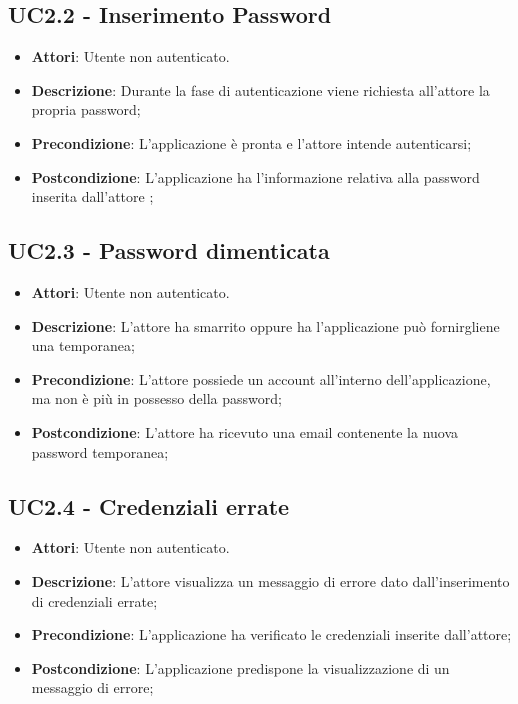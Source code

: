 \subsection{UC2.2 - Inserimento Password} 
\label{ssec:UC2.2} 
\begin{itemize} 
\item \textbf{Attori}: Utente non autenticato.
\item \textbf{Descrizione}: Durante la fase di autenticazione viene richiesta all'attore la propria password;
\item \textbf{Precondizione}: L'applicazione è pronta e l'attore intende autenticarsi;
\item \textbf{Postcondizione}: L'applicazione ha l’informazione relativa alla password inserita dall’attore
;
\end{itemize} 
\subsection{UC2.3 - Password dimenticata} 
\label{ssec:UC2.3} 
\begin{itemize} 
\item \textbf{Attori}: Utente non autenticato.
\item \textbf{Descrizione}: L'attore ha smarrito oppure ha l'applicazione può fornirgliene una temporanea;
\item \textbf{Precondizione}: L'attore possiede un account all'interno dell'applicazione, ma non è più in possesso della password;
\item \textbf{Postcondizione}: L'attore ha ricevuto una email contenente la nuova password temporanea;
\end{itemize} 
\subsection{UC2.4 - Credenziali errate} 
\label{ssec:UC2.4} 
\begin{itemize} 
\item \textbf{Attori}: Utente non autenticato.
\item \textbf{Descrizione}: L’attore visualizza un messaggio di errore dato dall’inserimento di credenziali errate;
\item \textbf{Precondizione}: L'applicazione ha verificato le credenziali inserite dall’attore;
\item \textbf{Postcondizione}: L'applicazione predispone la visualizzazione di un messaggio di errore;
\end{itemize} 
